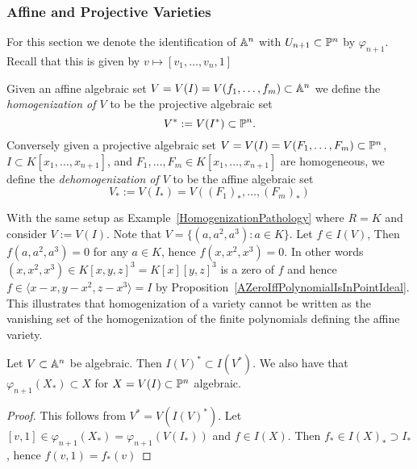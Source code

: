 \subsubsection{Affine and Projective Varieties}
    For this section we denote the identification of $\mathbb{A}^n$ with $U_{n+1}\subset \mathbb{P}^n$ by $\varphi_{n+1}$. Recall that this is given by $v\mapsto [v_1,\dots,v_n,1]$ 
    \begin{definition}
        Given an affine algebraic set $V=V(I)=V(f_1,\dots,f_m)\subset \mathbb{A}^n$ we define the \textit{homogenization of $V$} to be the projective algebraic set
        $$V^\ast := V(I^\ast)\subset \mathbb{P}^n.$$
        Conversely given a projective algebraic set $V=V(I)=V(F_1,\dots,F_m)\subset \mathbb{P}^n$, $I\subset K[x_1,\dots,x_{n+1}]$, and $F_1,\dots,F_m\in K[x_1,\dots,x_{n+1}]$ are homogeneous, we define the \textit{dehomogenization of $V$} to be the affine algebraic set
        $$V_\ast:= V(I_\ast) = V((F_1)_\ast,\dots,(F_m)_\ast)$$
    \end{definition}
    \begin{example}
        With the same setup as Example~\ref{HomogenizationPathology} where $R=K$ and consider $V:=V(I)$. Note that $V=\{ (a,a^2,a^3): a\in K\}$. Let $f\in I(V)$, Then $f(a,a^2,a^3)= 0$ for any $a\in K$, hence $f(x,x^2,x^3)=0$. In other words $(x,x^2,x^3)\in K[x,y,z]^3 = K[x][y,z]^3$ is a zero of $f$ and hence $f\in \langle x-x,y-x^2,z-x^3\rangle=I$ by Proposition~\ref{AZeroIffPolynomialIsInPointIdeal}.\\
        This illustrates that homogenization of a variety cannot be written as the vanishing set of the homogenization of the finite polynomials defining the affine variety.
    \end{example}
    \begin{lemma}
        Let $V\subset \mathbb{A}^n$ be algebraic. Then $I(V)^\ast \subset I(V^\ast)$. We also have that $\varphi_{n+1}(X_\ast) \subset X$ for $X=V(I)\subset \mathbb{P}^n$ algebraic.
    \end{lemma}
    \begin{proof}
        This follows from $V^\ast = V(I(V)^\ast).$ Let $[v,1]\in \varphi_{n+1}(X_\ast) =\varphi_{n+1}(V(I_\ast))$ and $f \in I(X)$. Then $f_\ast\in I(X)_\ast \supset I_\ast$, hence $f(v,1)= f_\ast(v)$
    \end{proof}
